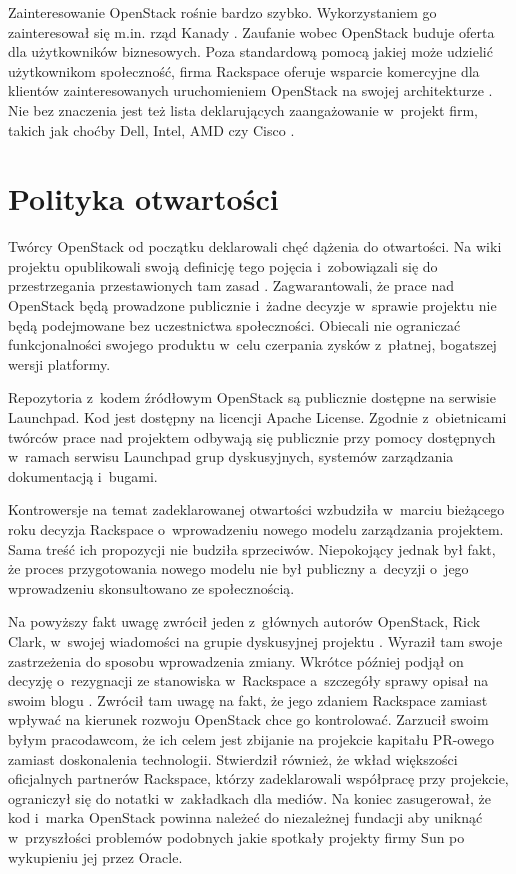 \documentclass[a4paper,12pt]{article}
\begin{document}
	Zainteresowanie OpenStack rośnie bardzo szybko. Wykorzystaniem go
	zainteresował się m.in. rząd Kanady \cite{computerworld_bort}. Zaufanie
	wobec OpenStack buduje oferta dla użytkowników biznesowych. Poza
	standardową pomocą jakiej może udzielić użytkownikom społeczność, firma
	Rackspace oferuje wsparcie komercyjne dla klientów zainteresowanych
	uruchomieniem OpenStack na swojej architekturze
	\cite{openstack_goes_commercial}. Nie bez znaczenia jest też lista
	deklarujących zaangażowanie w~projekt firm, takich jak choćby Dell, Intel,
	AMD czy Cisco \cite{openstack}.

	\section{Polityka otwartości}

	Twórcy OpenStack od początku deklarowali chęć dążenia do otwartości. Na wiki
	projektu opublikowali swoją definicję tego pojęcia i~zobowiązali się do
	przestrzegania przestawionych tam zasad \cite{openness}. Zagwarantowali, że
	prace nad OpenStack będą prowadzone publicznie i~żadne decyzje w~sprawie
	projektu nie będą podejmowane bez uczestnictwa społeczności. Obiecali
	nie ograniczać funkcjonalności swojego produktu w~celu czerpania zysków
	z~płatnej, bogatszej wersji platformy.

	Repozytoria z~kodem źródłowym OpenStack są publicznie dostępne na serwisie
	Launchpad. Kod jest dostępny na licencji Apache License. Zgodnie
	z~obietnicami twórców prace nad projektem odbywają się publicznie przy
	pomocy dostępnych w~ramach serwisu Launchpad grup dyskusyjnych, systemów
	zarządzania dokumentacją i~bugami.

	Kontrowersje na temat zadeklarowanej otwartości wzbudziła w~marciu bieżącego
	roku decyzja Rackspace o~wprowadzeniu nowego modelu zarządzania projektem.
	Sama treść ich propozycji nie budziła sprzeciwów. Niepokojący jednak był
	fakt, że proces przygotowania nowego modelu nie był publiczny a~decyzji
	o~jego wprowadzeniu skonsultowano ze społecznością.

	Na powyższy fakt uwagę zwrócił jeden z~głównych autorów OpenStack, Rick
	Clark, w~swojej wiadomości na grupie dyskusyjnej projektu
	\cite{clark_list_msg}. Wyraził tam swoje zastrzeżenia do sposobu
	wprowadzenia zmiany. Wkrótce później podjął on decyzję o~rezygnacji ze
	stanowiska w~Rackspace a~szczegóły sprawy opisał na swoim blogu
	\cite{why_i_left_rackspace}. Zwrócił tam uwagę na fakt, że jego zdaniem
	Rackspace zamiast wpływać na kierunek rozwoju OpenStack chce go kontrolować.
	Zarzucił swoim byłym pracodawcom, że ich celem jest zbijanie na projekcie
	kapitału PR-owego zamiast doskonalenia technologii. Stwierdził również, że
	wkład większości oficjalnych partnerów Rackspace, którzy zadeklarowali
	współpracę przy projekcie, ograniczył się do notatki w~zakładkach dla
	mediów. Na koniec zasugerował, że kod i~marka OpenStack powinna należeć do
	niezależnej fundacji aby uniknąć w~przyszłości problemów podobnych jakie
	spotkały projekty firmy Sun po wykupieniu jej przez Oracle.
\end{document}
